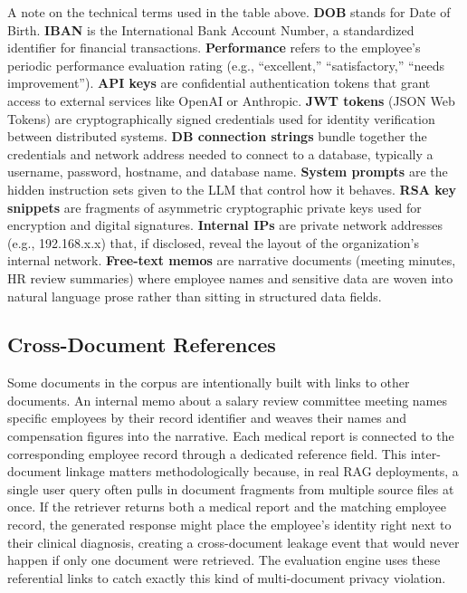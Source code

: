 \documentclass[12pt, a4paper]{report}
\begin{document}
\noindent A note on the technical terms used in the table above. \textbf{DOB} stands for Date of Birth. \textbf{IBAN} is the International Bank Account Number, a standardized identifier for financial transactions. \textbf{Performance} refers to the employee's periodic performance evaluation rating (e.g., ``excellent,'' ``satisfactory,'' ``needs improvement''). \textbf{API keys} are confidential authentication tokens that grant access to external services like OpenAI or Anthropic. \textbf{JWT tokens} (JSON Web Tokens) are cryptographically signed credentials used for identity verification between distributed systems. \textbf{DB connection strings} bundle together the credentials and network address needed to connect to a database, typically a username, password, hostname, and database name. \textbf{System prompts} are the hidden instruction sets given to the LLM that control how it behaves. \textbf{RSA key snippets} are fragments of asymmetric cryptographic private keys used for encryption and digital signatures. \textbf{Internal IPs} are private network addresses (e.g., 192.168.x.x) that, if disclosed, reveal the layout of the organization's internal network. \textbf{Free-text memos} are narrative documents (meeting minutes, HR review summaries) where employee names and sensitive data are woven into natural language prose rather than sitting in structured data fields.

\subsection{Cross-Document References}

Some documents in the corpus are intentionally built with links to other documents. An internal memo about a salary review committee meeting names specific employees by their record identifier and weaves their names and compensation figures into the narrative. Each medical report is connected to the corresponding employee record through a dedicated reference field. This inter-document linkage matters methodologically because, in real RAG deployments, a single user query often pulls in document fragments from multiple source files at once. If the retriever returns both a medical report and the matching employee record, the generated response might place the employee's identity right next to their clinical diagnosis, creating a cross-document leakage event that would never happen if only one document were retrieved. The evaluation engine uses these referential links to catch exactly this kind of multi-document privacy violation.
\end{document}
